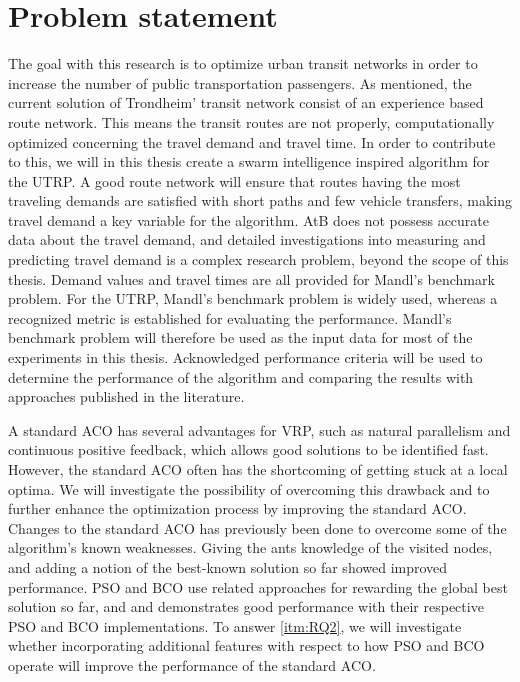 \section{Problem statement}
\label{subsec:problemStatement}

The goal with this research is to optimize urban transit networks in order to increase the number of public transportation passengers. As mentioned, the current solution of Trondheim' transit network consist of an experience based route network. This means the transit routes are not properly, computationally optimized concerning the travel demand and travel time. In order to contribute to this, we will in this thesis create a swarm intelligence inspired algorithm for the UTRP. A good route network will ensure that routes having the most traveling demands are satisfied with short paths and few vehicle transfers, making travel demand a key variable for the algorithm. AtB\citep{website:atb} does not possess accurate data about the travel demand, and detailed investigations into measuring and predicting travel demand is a complex research problem, beyond the scope of this thesis. Demand values and travel times are all provided for Mandl's benchmark problem\citep{mandl79}. For the UTRP, Mandl's benchmark problem is widely used, whereas a recognized metric is established for evaluating the performance. Mandl's benchmark problem will therefore be used as the input data for most of the experiments in this thesis. Acknowledged performance criteria will be used to determine the performance of the algorithm and comparing the results with approaches published in the literature\citep{nikolic14,kechagiopoulos14,mandl79,kidwai98, fan10, chakroborty02, zhang10, chew12}.

A standard ACO has several advantages for VRP, such as natural parallelism and continuous positive feedback, which allows good solutions to be identified fast. However, the standard ACO often has the shortcoming  of getting stuck at a local optima. We will investigate the possibility of overcoming this drawback and to further enhance the optimization process by improving the standard ACO. Changes to the standard ACO has previously been done to overcome some of the algorithm's known weaknesses. Giving the ants knowledge of the visited nodes\citep{sedighpour14,salehinejad10,poorzahedy11}, and adding a notion of the best-known solution so far\citep{tripathi09,sedighpour14} showed improved performance. PSO and BCO use related approaches for rewarding the global best solution so far, and \citet{kechagiopoulos14} and \citet{nikolic14} demonstrates good performance with their respective PSO and BCO implementations. To answer \vref{itm:RQ2}, we will investigate whether incorporating additional features with respect to how PSO and BCO operate will improve the performance of the standard ACO.

